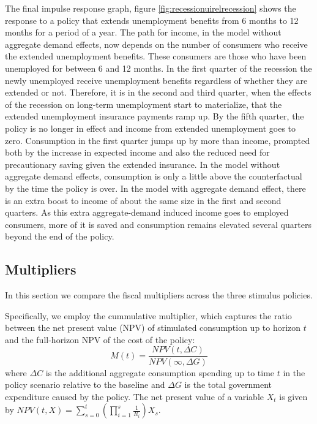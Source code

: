 \documentclass[../HAFiscal]{subfiles}
\begin{document}
The final impulse response graph, figure \ref{fig:recessionuirelrecession} shows the response to a policy that extends unemployment benefits from 6 months to 12 months for a period of a year. The path for income, in the model without aggregate demand effects, now depends on the number of consumers who receive the extended unemployment benefits. These consumers are those who have been unemployed for between 6 and 12 months. In the first quarter of the recession the newly unemployed receive unemployment benefits regardless of whether they are extended or not. Therefore, it is in the second and third quarter, when the effects of the recession on long-term unemployment start to materialize, that the extended unemployment insurance payments ramp up. By the fifth quarter, the policy is no longer in effect and income from extended unemployment goes to zero. Consumption in the first quarter jumps up by more than income, prompted both by the increase in expected income and also the reduced need for precautionary saving given the extended insurance. In the model without aggregate demand effects, consumption is only a little above the counterfactual by the time the policy is over. In the model with aggregate demand effect, there is an extra boost to income of about the same size in the first and second quarters. As this extra aggregate-demand induced income goes to employed consumers, more of it is saved and consumption remains elevated several quarters beyond the end of the policy.



\FloatBarrier
\subsection{Multipliers}

In this section we compare the fiscal multipliers across the three stimulus policies. 

Specifically, we employ the cummulative multiplier, which captures the ratio between the net present value (NPV) of stimulated consumption up to horizon $t$ and the full-horizon NPV of the cost of the policy:
\begin{equation*}
M(t) = \frac{NPV(t,\Delta C)}{NPV (\infty,\Delta G)}
\end{equation*}
where $\Delta C$ is the additional aggregate consumption spending up to time $t$ in the policy scenario relative to the baseline and $\Delta G$ is the total government expenditure caused by the policy. The net present value of a variable $X_t$ is given by 
$NPV(t,X) = \sum_{s=0}^{t} \left( \prod_{i=1}^{s} \frac{1}{R_i} \right) X_s$. 
\end{document}
